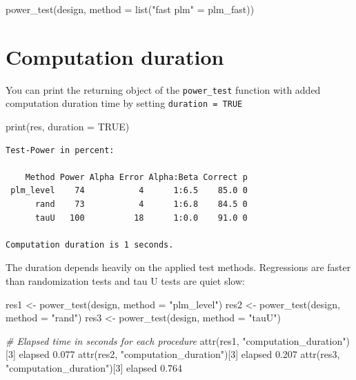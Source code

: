 \documentclass[
]{book}
\newenvironment{Shaded}{\begin{snugshade}}{\end{snugshade}}
\newcommand{\AttributeTok}[1]{\textcolor[rgb]{0.77,0.63,0.00}{#1}}
\newcommand{\CommentTok}[1]{\textcolor[rgb]{0.56,0.35,0.01}{\textit{#1}}}
\newcommand{\ConstantTok}[1]{\textcolor[rgb]{0.00,0.00,0.00}{#1}}
\newcommand{\DecValTok}[1]{\textcolor[rgb]{0.00,0.00,0.81}{#1}}
\newcommand{\FloatTok}[1]{\textcolor[rgb]{0.00,0.00,0.81}{#1}}
\newcommand{\FunctionTok}[1]{\textcolor[rgb]{0.00,0.00,0.00}{#1}}
\newcommand{\NormalTok}[1]{#1}
\newcommand{\OtherTok}[1]{\textcolor[rgb]{0.56,0.35,0.01}{#1}}
\newcommand{\StringTok}[1]{\textcolor[rgb]{0.31,0.60,0.02}{#1}}
\begin{document}
\begin{Shaded}
\begin{Highlighting}[]
\FunctionTok{power\_test}\NormalTok{(design, }\AttributeTok{method =} \FunctionTok{list}\NormalTok{(}\StringTok{"fast plm"} \OtherTok{=}\NormalTok{ plm\_fast))}
\end{Highlighting}
\end{Shaded}

\hypertarget{computation-duration}{%
\section{Computation duration}\label{computation-duration}}

You can print the returning object of the \texttt{power\_test} function with added computation duration time by setting \texttt{duration\ =\ TRUE}

\begin{Shaded}
\begin{Highlighting}[]
\FunctionTok{print}\NormalTok{(res, }\AttributeTok{duration =} \ConstantTok{TRUE}\NormalTok{)}
\end{Highlighting}
\end{Shaded}

\begin{verbatim}
Test-Power in percent:

    Method Power Alpha Error Alpha:Beta Correct p
 plm_level    74           4      1:6.5    85.0 0
      rand    73           4      1:6.8    84.5 0
      tauU   100          18      1:0.0    91.0 0

Computation duration is 1 seconds.
\end{verbatim}

The duration depends heavily on the applied test methods. Regressions are faster than randomization tests and tau U tests are quiet slow:

\begin{Shaded}
\begin{Highlighting}[]
\NormalTok{res1 }\OtherTok{\textless{}{-}} \FunctionTok{power\_test}\NormalTok{(design, }\AttributeTok{method =} \StringTok{"plm\_level"}\NormalTok{)}
\NormalTok{res2 }\OtherTok{\textless{}{-}} \FunctionTok{power\_test}\NormalTok{(design, }\AttributeTok{method =} \StringTok{"rand"}\NormalTok{)}
\NormalTok{res3 }\OtherTok{\textless{}{-}} \FunctionTok{power\_test}\NormalTok{(design, }\AttributeTok{method =} \StringTok{"tauU"}\NormalTok{)}

\CommentTok{\# Elapsed time in seconds for each procedure}
\FunctionTok{attr}\NormalTok{(res1, }\StringTok{"computation\_duration"}\NormalTok{)[}\DecValTok{3}\NormalTok{]}
\NormalTok{elapsed }
  \FloatTok{0.077} 
\FunctionTok{attr}\NormalTok{(res2, }\StringTok{"computation\_duration"}\NormalTok{)[}\DecValTok{3}\NormalTok{]}
\NormalTok{elapsed }
  \FloatTok{0.207} 
\FunctionTok{attr}\NormalTok{(res3, }\StringTok{"computation\_duration"}\NormalTok{)[}\DecValTok{3}\NormalTok{]}
\NormalTok{elapsed }
  \FloatTok{0.764} 
\end{Highlighting}
\end{Shaded}
\end{document}
